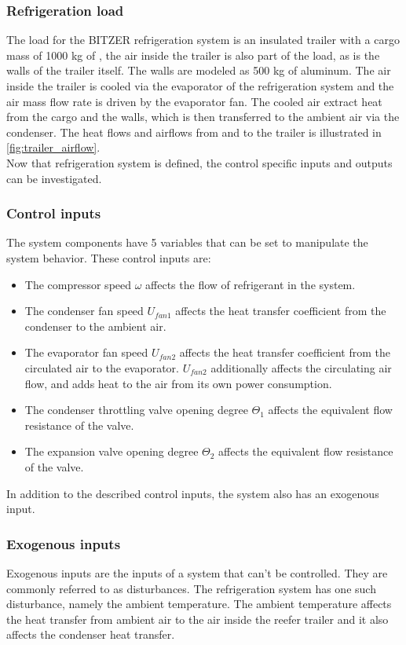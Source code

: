 \subsubsection{Refrigeration load}
The load for the BITZER refrigeration system is an insulated trailer with a cargo mass of 1000 kg of , the air inside the trailer is also part of the load, as is the walls of the trailer itself. The walls are modeled as 500 kg of aluminum. The air inside the trailer is cooled via the evaporator of the refrigeration system and the air mass flow rate is driven by the evaporator fan. The cooled air extract heat from the cargo and the walls, which is then transferred to the ambient air via the condenser. The heat flows and airflows from and to the trailer is illustrated in \cref{fig:trailer_airflow}.\\
Now that refrigeration system is defined, the control specific inputs and outputs can be investigated.\\

\subsubsection{Control inputs}
The system components have 5 variables that can be set to manipulate the system behavior. These control inputs are:
\begin{itemize}
	\item The compressor speed $ \omega $ affects the flow of refrigerant in the system.
	\item The condenser fan speed $ U_{fan1} $ affects the heat transfer coefficient from the condenser to the ambient air.
	\item The evaporator fan speed  $ U_{fan2} $ affects the heat transfer coefficient from the circulated air to the evaporator. $ U_{fan2} $ additionally affects the circulating air flow, and adds heat to the air from its own power consumption.
	\item The condenser throttling valve opening degree $ \Theta_1 $ affects the equivalent flow resistance of the valve.
	\item The expansion valve opening degree $ \Theta_2 $ affects the equivalent flow resistance of the valve.
\end{itemize}
In addition to the described control inputs, the system also has an exogenous input. 

\subsubsection{Exogenous inputs}
Exogenous inputs are the inputs of a system that can't be controlled. They are commonly referred to as disturbances. The refrigeration system has one such disturbance, namely the ambient temperature. The ambient temperature affects the heat transfer from ambient air to the air inside the reefer trailer and it also affects the condenser heat transfer.\\

